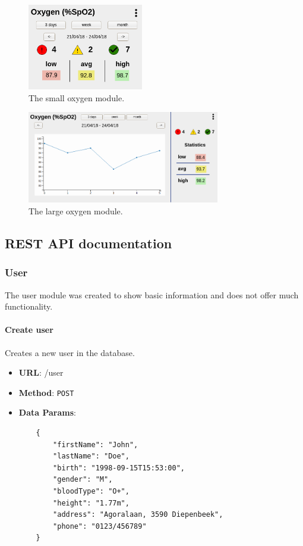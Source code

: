 \begin{figure}[!htb]
    \centering
    \includegraphics[width=0.45\textwidth]{chapters/3_design/mockups/oxygen_small}
    \caption{The small oxygen module.}\label{fig:oxygen_small}
\end{figure}

\begin{figure}[!htb]
    \centering
    \includegraphics[width=0.75\textwidth]{chapters/3_design/mockups/oxygen_large}
    \caption{The large oxygen module.}\label{fig:oxygen_large}
\end{figure}

\clearpage
\subsection{REST API documentation} \label{app_rest_api}

    \subsubsection{User}

        The user module was created to show basic information and does not offer much functionality.

        \paragraph{Create user} Creates a new user in the database.
        \begin{itemize}
            \item \textbf{URL}: /user
            \item \textbf{Method}: \texttt{POST}
            \item \textbf{Data Params}: \begin{verbatim}
    {
        "firstName": "John",
        "lastName": "Doe",
        "birth": "1998-09-15T15:53:00",
        "gender": "M",
        "bloodType": "O+",
        "height": "1.77m",
        "address": "Agoralaan, 3590 Diepenbeek",
        "phone": "0123/456789"
    }
            \end{verbatim}
        \end{itemize}

